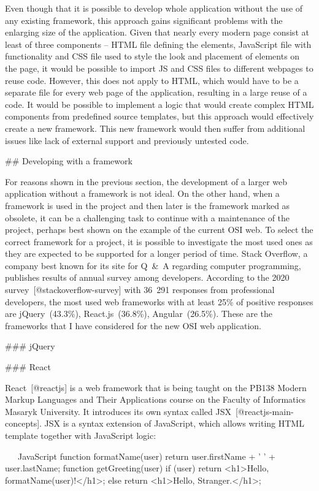 \documentclass[
  digital, %
  oneside, %
  lof,     %
  lot,     %
]{fithesis4}
\begin{document}
{Even though that it is possible to develop whole application without the use of any existing framework, this approach gains significant problems with the enlarging size of the application. Given that nearly every modern page consist at least of three components -- HTML file defining the elements, JavaScript file with functionality and CSS file used to style the look and placement of elements on the page, it would be possible to import JS and CSS files to different webpages to reuse code. However, this does not apply to HTML, which would have to be a separate file for every web page of the application, resulting in a large reuse of a code. It would be possible to implement a logic that would create complex HTML components from predefined source templates, but this approach would effectively create a new framework. This new framework would then suffer from additional issues like lack of external support and previously untested code.

## Developing with a framework

For reasons shown in the previous section, the development of a larger web application without a framework is not ideal. On the other hand, when a framework is used in the project and then later is the framework marked as obsolete, it can be a challenging task to continue with a maintenance of the project, perhaps best shown on the example of the current OSI web. To select the correct framework for a project, it is possible to investigate the most used ones as they are expected to be supported for a longer period of time. Stack Overflow, a company best known for its site for Q~\&~A regarding computer programming, publishes results of annual survey among developers. According to the 2020 survey~[@stackoverflow-survey] with 36~291 responses from professional developers, the most used web frameworks with at least 25\% of positive responses are jQuery~(43.3\%), React.js~(36.8\%), Angular~(26.5\%). These are the frameworks that I have considered for the new OSI web application.

### jQuery

### React

React~[@reactjs] is a web framework that is being taught on the PB138 Modern Markup Languages and Their Applications course on the Faculty of Informatics Masaryk University. It introduces its own syntax called JSX~[@reactjs-main-concepts]. JSX is a syntax extension of JavaScript, which allows writing HTML template together with JavaScript logic:

~~~JavaScript
function formatName(user) {
  return user.firstName + ' ' + user.lastName;
}
function getGreeting(user) {
  if (user) return <h1>Hello, {formatName(user)}!</h1>;
  else return <h1>Hello, Stranger.</h1>;
}
~~~

}
\end{document}
